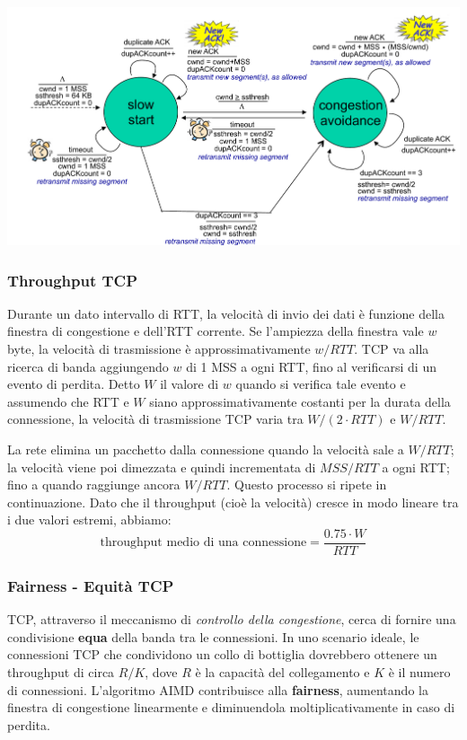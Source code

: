 \begin{center}
\includegraphics[width=\textwidth]{./img/diagrammacontrollodicongestione.png}
\end{center}

\subsubsection{Throughput TCP}
Durante un dato intervallo di RTT, la velocità di invio dei dati è funzione della finestra di congestione e dell'RTT corrente. Se l'ampiezza della finestra vale $w$ byte, la velocità di trasmissione è approssimativamente $w/RTT$. TCP va alla ricerca di banda aggiungendo $w$ di 1 MSS a ogni RTT, fino al verificarsi di un evento di perdita. Detto $W$ il valore di $w$ quando si verifica tale evento e assumendo che RTT e $W$ siano approssimativamente costanti per la durata della connessione, la velocità di trasmissione TCP varia tra $W/(2 \cdot RTT)$ e $W/RTT$.

La rete elimina un pacchetto dalla connessione quando la velocità sale a $W/RTT$; la velocità viene poi dimezzata e quindi incrementata di $MSS/RTT$ a ogni RTT; fino a quando raggiunge ancora $W/RTT$. Questo processo si ripete in continuazione. Dato che il throughput (cioè la velocità) cresce in modo lineare tra i due valori estremi, abbiamo:
\[
\text{throughput medio di una connessione} = \frac{0.75 \cdot W}{RTT}
\]
\subsubsection{Fairness - Equità TCP}
TCP, attraverso il meccanismo di \textit{controllo della congestione}, cerca di fornire una condivisione \textbf{equa} della banda tra le connessioni. In uno scenario ideale, le connessioni TCP che condividono un collo di bottiglia dovrebbero ottenere un throughput di circa $R/K$, dove $R$ è la capacità del collegamento e $K$ è il numero di connessioni. L'algoritmo AIMD contribuisce alla \textbf{fairness}, aumentando la finestra di congestione linearmente e diminuendola moltiplicativamente in caso di perdita.

